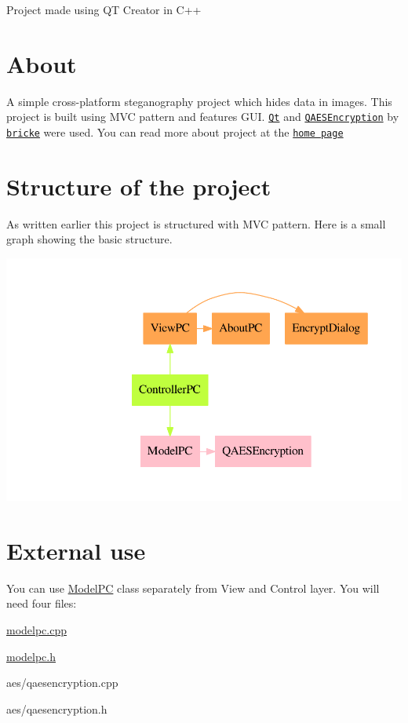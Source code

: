 Project made using QT Creator in C++\hypertarget{index_about}{}\section{About}\label{index_about}
A simple cross-\/platform steganography project which hides data in images. This project is built using M\+VC pattern and features G\+UI. \href{https://qt.io}{\tt Qt} and \href{https://github.com/bricke/Qt-AES}{\tt Q\+A\+E\+S\+Encryption} by \href{https://github.com/bricke}{\tt bricke} were used. You can read more about project at the \href{waleko.github.io/PictureCrypt}{\tt home page}\hypertarget{index_structure}{}\section{Structure of the project}\label{index_structure}
As written earlier this project is structured with M\+VC pattern. Here is a small graph showing the basic structure. 
\begin{DoxyImageNoCaption}
  \mbox{\includegraphics[width=\textwidth,height=\textheight/2,keepaspectratio=true]{dot_structure}}
\end{DoxyImageNoCaption}
\hypertarget{index_ext-use}{}\section{External use}\label{index_ext-use}
You can use \hyperlink{class_model_p_c}{Model\+PC} class separately from View and Control layer. You will need four files\+:


\begin{DoxyItemize}
\item \hyperlink{modelpc_8cpp}{modelpc.\+cpp} 
\item \hyperlink{modelpc_8h}{modelpc.\+h} 
\item aes/qaesencryption.\+cpp 
\item aes/qaesencryption.\+h 
\end{DoxyItemize}

